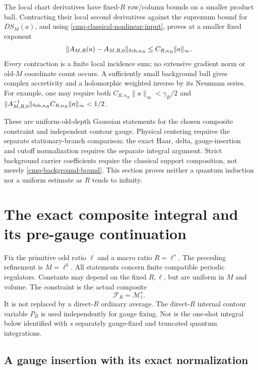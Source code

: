 \documentclass[11pt]{article}
\theoremstyle{remark}
\begin{document}
The local chart derivatives have fixed-$R$ row/column bounds on
a smaller product ball. Contracting their local second
derivatives against the supremum bound for $DS_M(a)$, and using
\eqref{cmq-classical-nonlinear-input}, proves at a smaller fixed
exponent
\begin{equation}
 \|A_{M,R}(a)-A_{M,R,0}\|_{{\rm Sch},\kappa_R}
 \leq C_{R,\kappa_R}\|a\|_\infty.
 \label{cmq-background-bound}
\end{equation}
Every contraction is a finite local incidence sum; no extensive
gradient norm or old-$M$ coordinate count occurs. A sufficiently
small background ball gives complex accretivity and a
holomorphic weighted inverse by its Neumann series. For example,
one may require both
$C_{R,\kappa_R}\|a\|_\infty<\gamma_R/2$ and
$\|A_{M,R,0}^{-1}\|_{{\rm Sch},\kappa_R}
 C_{R,\kappa_R}\|a\|_\infty<1/2$.

These are uniform-old-depth Gaussian statements for the chosen
composite constraint and independent contour gauge. Physical
centering requires the separate stationary-branch comparison;
the exact Haar, delta, gauge-insertion and cutoff normalization
requires the separate integral argument. Strict background
carrier coefficients require the classical support composition,
not merely \eqref{cmq-background-bound}. This section proves
neither a quantum induction nor a uniform estimate as $R$ tends
to infinity.

\section{The exact composite integral and its pre-gauge continuation}
\label{cmi-section}

Fix the primitive odd ratio $\ell$ and a macro ratio $R=\ell^s$.
The preceding refinement is $M=\ell^k$. All statements concern
finite compatible periodic regulators. Constants may depend on the
fixed $R,\ell$, but are uniform in $M$ and volume. The constraint is
the actual composite
\[
 \mathcal F_R=\mathcal M_\ell^s.
\]
It is not replaced by a direct-$R$ ordinary average. The direct-$R$
internal contour variable $P_R$ is used independently for gauge
fixing. Nor is the one-shot integral below identified with $s$
separately gauge-fixed and truncated quantum integrations.

\subsection{A gauge insertion with its exact normalization}
\label{cmi-gauge-section}
\end{document}
